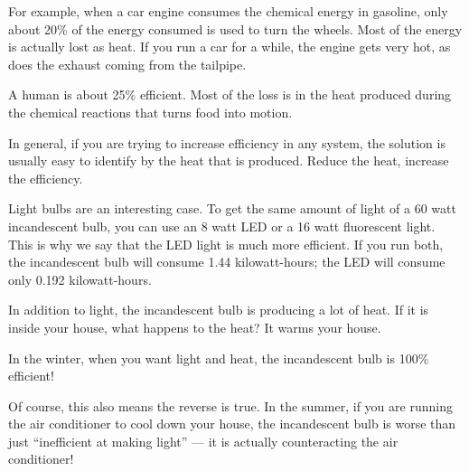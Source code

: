 For example, when a car engine consumes the chemical energy in gasoline, only
about 20\% of the energy consumed is used to turn the wheels. Most of the energy 
is actually lost as heat. If you run a car for a while, the engine gets very hot, 
as does the exhaust coming from the tailpipe.

A human is about 25\% efficient. Most of the loss is in the heat produced during 
the chemical reactions that turns food into motion.

In general, if you are trying to increase efficiency in any system, the solution 
is usually easy to identify by the heat that is produced. Reduce the heat, increase 
the efficiency.

Light bulbs are an interesting case. To get the same amount of light of a 60 watt 
incandescent bulb, you can use an 8 watt LED or a 16 watt fluorescent light. This 
is why we say that the LED light is much more efficient. If you run both, the 
incandescent bulb will consume 1.44 kilowatt-hours; the LED will consume only 
0.192 kilowatt-hours. 

In addition to light, the incandescent bulb is producing a lot of heat. If it
is inside your house, what happens to the heat? It warms your house.

In the winter, when you want light and heat, the incandescent bulb is
100\% efficient!

Of course, this also means the reverse is true. In the summer, if you are running 
the air conditioner to cool down your house, the incandescent bulb is worse than 
just ``inefficient at making light'' --- it is actually counteracting the air 
conditioner!
